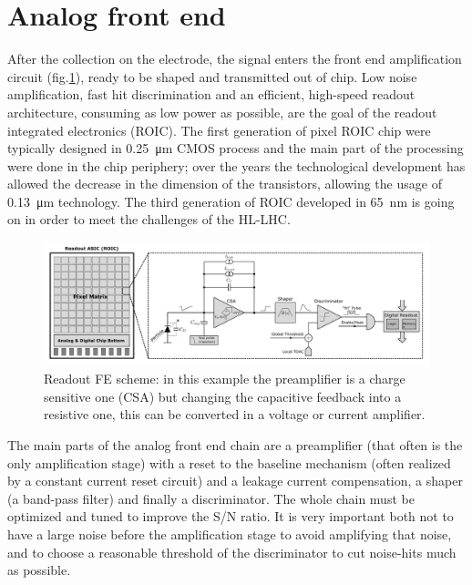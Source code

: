 \section{Analog front end}\label{subsec:preamplifier}
   After the collection on the electrode, the signal enters the front end amplification circuit (fig.\ref{fig:readout_scheme}), ready to be shaped and transmitted out of chip. Low noise amplification, fast hit discrimination and an efficient, high-speed readout architecture, consuming as low power as possible, are the goal of the readout integrated electronics (ROIC).
   The first generation of pixel ROIC chip were typically designed in \SI{0.25}{\um} CMOS process and the main part of the processing were done in the chip periphery; over the years the technological development has allowed the decrease in the dimension of the transistors, allowing the usage of \SI{0.13}{\um} technology. The third generation of ROIC developed in \SI{65}{nm} is going on in order to meet the challenges of the HL-LHC.
   \begin{figure}
      \centering
      \includegraphics[width=1.\linewidth]{figures/Pixel_detectors/readout_scheme.png}
      \caption{Readout FE scheme: in this example the preamplifier is a charge sensitive one (CSA) but changing the capacitive feedback into a resistive one, this can be converted in a voltage or current amplifier.}
      \label{fig:readout_scheme}
   \end{figure}
   The main parts of the analog front end chain are a preamplifier (that often is the only amplification stage) with a reset to the baseline mechanism (often realized by a constant current reset circuit) and a leakage current compensation, a shaper (a band-pass filter) and finally a discriminator. The whole chain must be optimized and tuned to improve the S/N ratio. It is very important both not to have a large noise before the amplification stage to avoid amplifying that noise, and to choose a reasonable threshold of the discriminator to cut noise-hits much as possible.

